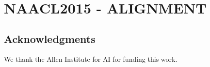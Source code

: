 %

\chapter{NAACL2015 - ALIGNMENT\label{chapter:naacl2015}}







%
%

\section*{Acknowledgments}
We thank the Allen Institute for AI for funding this work.

%

%
%
%
%

